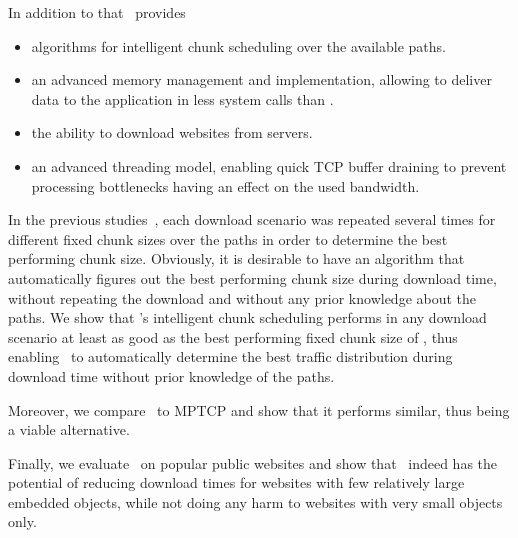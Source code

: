 In addition to that \protonew~provides 

\begin{itemize}
\item algorithms for intelligent chunk scheduling over the available paths. 
\item an advanced memory management and implementation, allowing to deliver data to the application in less system calls than \protoold.
\item the ability to download websites from servers. 
\item an advanced threading model, enabling quick TCP buffer draining to prevent processing bottlenecks having an effect on the used bandwidth. 
\end{itemize}

In the previous studies~\cite{JKIM14-TUND}\cite{KIMSIG}, each download scenario was repeated several times for different fixed chunk sizes over the paths in order to determine the best performing chunk size. 
Obviously, it is desirable to have an algorithm that automatically figures out the best performing chunk size during download time, without repeating the download and without any prior knowledge about the paths. 
We show that \protonew's intelligent chunk scheduling performs in any download scenario at least as good as the best performing fixed chunk size of \protoold, thus enabling \mhttp~to automatically determine the best traffic distribution during download time without prior knowledge of the paths. 

Moreover, we compare \protonew~to MPTCP and show that it performs similar, thus being a viable alternative. 

Finally, we evaluate \protonew~on popular public websites and show that \mhttp~indeed has the potential of reducing download times for websites with few relatively large embedded objects, while not doing any harm to websites with very small objects only. 

